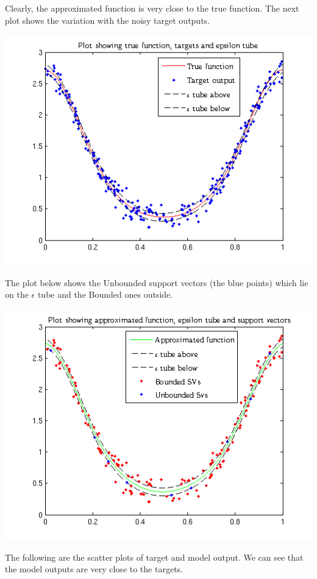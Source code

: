 \documentclass{article}
\begin{document}
Clearly, the approximated function is very close to the true function. The next plot shows the variation with the noisy target outputs.
\begin{center}
\includegraphics[scale=1]{Regression/Plot_2}
\end{center}
The plot below shows the Unbounded support vectors (the blue points) which lie on the $\epsilon$ tube and the Bounded ones outside.
\begin{center}
\includegraphics[scale=1]{Regression/Plot_3}
\end{center}
The following are the scatter plots of target and model output. We can see that the model outputs are very close to the targets. 
\end{document}
